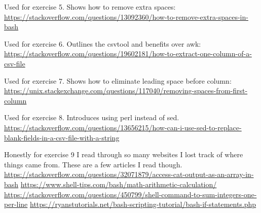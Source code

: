 \documentclass{article}
\begin{document}
Used for exercise 5. Shows how to remove extra spaces:
\url{https://stackoverflow.com/questions/13092360/how-to-remove-extra-spaces-in-bash}

Used for exercise 6. Outlines the csvtool and benefits over awk:
\url{https://stackoverflow.com/questions/19602181/how-to-extract-one-column-of-a-csv-file}

Used for exercise 7. Shows how to eliminate leading space before column:
\url{https://unix.stackexchange.com/questions/117040/removing-spaces-from-first-column}

Used for exercise 8. Introduces using perl instead of sed.
\url{https://stackoverflow.com/questions/13656215/how-can-i-use-sed-to-replace-blank-fields-in-a-csv-file-with-a-string}

Honestly for exercise 9 I read through so many websites I lost track of where things came from. These are a few articles I read though.
\url{https://stackoverflow.com/questions/32071879/access-cat-output-as-an-array-in-bash}
\url{https://www.shell-tips.com/bash/math-arithmetic-calculation/}
\url{https://stackoverflow.com/questions/450799/shell-command-to-sum-integers-one-per-line}
\url{https://ryanstutorials.net/bash-scripting-tutorial/bash-if-statements.php} 
\end{document}
